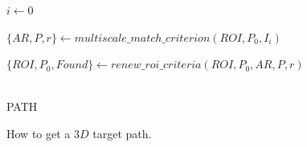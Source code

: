\begin{algorithm}
 $i \leftarrow 0$ \;
~\\
{
    $\{AR,P,r\} \leftarrow multiscale\_match\_criterion(ROI,P_0,I_i)$\;
    
    $\{ROI,P_0,Found\} \leftarrow renew\_roi\_criteria(ROI,P_0,AR,P,r)$\;
}
~\\
\Return PATH \;
\caption{How to get a $3D$ target path.}
\label{alg:system}
\end{algorithm}

